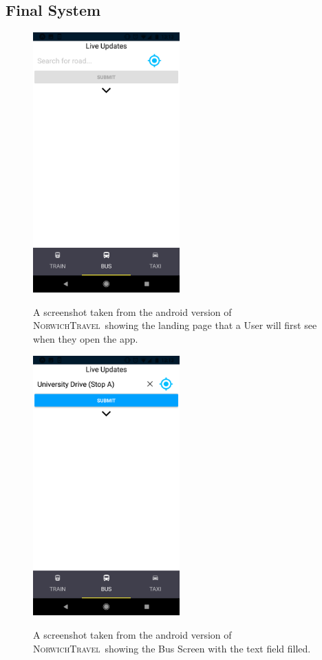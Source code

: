 \documentclass[cmpstyle]{ueacmpstyle}
\newcommand{\nt}{\textsc{NorwichTravel}}
\begin{document}
		\subsection{Final System} \label{app:final}
		
		\begin{figure}[h]
			\centering
			\includegraphics[height=10cm]{images/android-landing.png}\\
			\caption{A screenshot taken from the android version of \nt \ showing the landing page that a User will first see when they open the app.}\label{fig:android-landing}
		\end{figure}
		\begin{figure}[h]
			\centering
			\includegraphics[height=10cm]{images/android-bus-1.png}\\
			\caption{A screenshot taken from the android version of \nt \ showing the Bus Screen with the text field filled.}\label{fig:android-bus-1}
		\end{figure}
\end{document}
